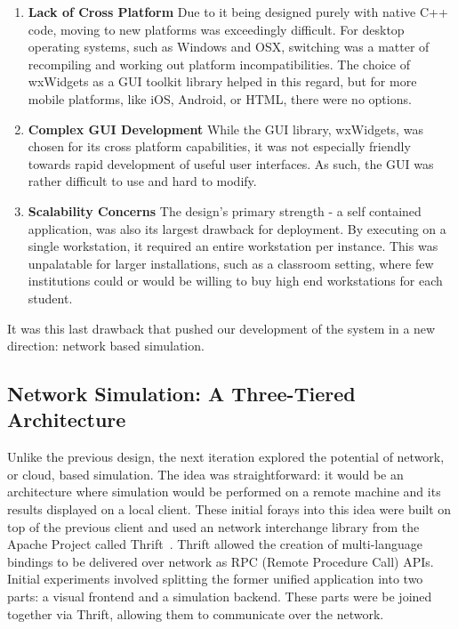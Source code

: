  \begin{enumerate}

   \item \textbf{Lack of Cross Platform} Due to it being designed
     purely with native C++ code, moving to new platforms was
     exceedingly difficult. For desktop operating systems, such as
     Windows and OSX, switching was a matter of recompiling and
     working out platform incompatibilities. The choice of wxWidgets as
     a GUI toolkit library helped in this regard, but for more mobile
     platforms, like iOS, Android, or HTML, there were no options.   
   
   \item \textbf{Complex GUI Development} While the GUI library,
     wxWidgets, was chosen for its cross platform capabilities, it was
     not especially friendly towards rapid development of useful user
     interfaces. As such, the GUI was rather difficult to use and hard
     to modify.

   \item \textbf{Scalability Concerns} The design's primary strength -
     a self contained application, was also its largest drawback for
     deployment. By executing on a single workstation, it required an
     entire workstation per instance. This was unpalatable for larger
     installations, such as a classroom setting, where few institutions
     could or would be willing to buy high end workstations for each student.
   
 \end{enumerate}

 
 It was this last drawback that pushed our development of the system
 in a new direction: network based simulation.

 \subsection{Network Simulation: A Three-Tiered Architecture}
\label{ssec:threetier}
 
 Unlike the previous design, the next iteration explored the potential
 of network, or cloud, based simulation. The idea was straightforward:
 it would be an architecture where simulation would be performed on a
 remote machine and its results displayed on a local client. These
 initial forays into this idea were built on top of the previous client and
 used an network interchange library from the Apache Project called
 Thrift~\citep{ASF:2008--2014}. Thrift allowed the creation of multi-language bindings to be
 delivered over network as RPC (Remote Procedure Call) APIs. Initial
 experiments involved splitting the former unified application into
 two parts: a visual frontend and a simulation backend. These parts
 were be joined together via Thrift, allowing them to communicate over
 the network.


